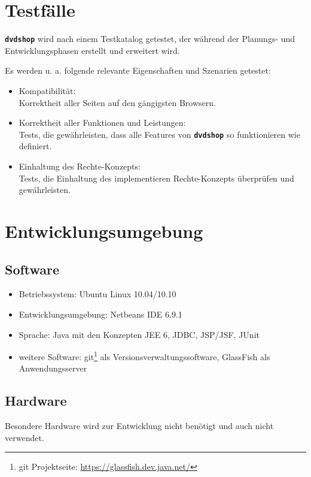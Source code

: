 \documentclass[12pt,oneside,a4paper,bibtotoc,liststotoc,pointlessnumbers]{scrartcl}
\begin{document}
\newpage
\section{Testfälle}
\texttt{\textbf{dvdshop}} wird nach einem Testkatalog getestet, der während der Planungs- und Entwicklungsphasen erstellt und erweitert wird.\par
Es werden u. a. folgende relevante Eigenschaften und Szenarien getestet:
\begin{itemize}
\item Kompatibilität: \\Korrektheit aller Seiten auf den gängigsten Browsern.
\item Korrektheit aller Funktionen und Leistungen: \\Tests, die gewährleisten, dass alle Features von \texttt{\textbf{dvdshop}} so funktionieren wie definiert.
\item Einhaltung des Rechte-Konzepts: \\Tests, die Einhaltung des implementieren Rechte-Konzepts überprüfen und gewährleisten.
\end{itemize}

\newpage
\section{Entwicklungsumgebung}
\subsection{Software}
\begin{itemize}
\item Betriebssystem: Ubuntu Linux 10.04/10.10
\item Entwicklungsumgebung: Netbeans IDE 6.9.1
\item Sprache: Java mit den Konzepten JEE 6, JDBC, JSP/JSF, JUnit
\item weitere Software: git\footnote{git Projektseite: \url{https://glassfish.dev.java.net/}} als Versionsverwaltungssoftware, GlassFish als Anwendungsserver
\end{itemize}
\subsection{Hardware}
Besondere Hardware wird zur Entwicklung nicht benötigt und auch nicht verwendet.

\newpage

\end{document}
